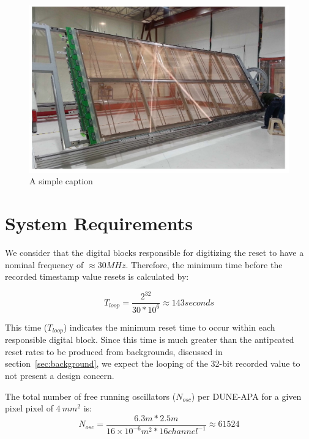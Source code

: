 \begin{figure}[]
\centering
\includegraphics[width=\textwidth]{images/dune_fd_tdr_apa_image.jpg}
\caption{A simple caption \citep{DUNE-FD_TDRv4:Abi_2020}}
\end{figure}

\section{System Requirements}

We consider that the digital blocks responsible for digitizing the reset to have a nominal frequency of $\approx 30 MHz$.
Therefore, the minimum time before the recorded timestamp value resets is calculated by:

\begin{equation}
T_{loop} = \frac{2^{32}}{30*10^{6}} \approx 143 seconds
\end{equation}

This time ($T_{loop}$) indicates the minimum reset time to occur within each responsible digital block.
Since this time is much greater than the antipcated reset rates to be produced from backgrounds, discussed in section~\ref{sec:background}, we expect the looping of the 32-bit recorded value to not present a design concern.

The total number of free running oscillators ($N_{osc}$) per DUNE-APA for a given pixel pixel of $4~mm^{2}$ is:
\begin{equation}
N_{osc} = \frac{6.3 \unit{m} * 2.5 \unit{m} }{16\times10^{-6}\unit{m^{2}} * 16 \unit{channel^{-1}}} \approx 61524
\end{equation}~\label{eq:nosc}

